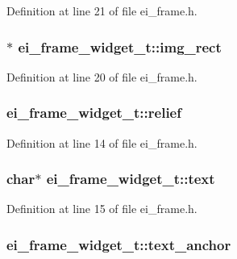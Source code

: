 Definition at line 21 of file ei\_\-frame.h.\hypertarget{structei__frame__widget__t_a0e3772cc22eb4339b9a1c12b0cbd6667}{
\subsubsection[{img\_\-rect}]{$\ast$ {\bf ei\_\-frame\_\-widget\_\-t::img\_\-rect}}}
\label{structei__frame__widget__t_a0e3772cc22eb4339b9a1c12b0cbd6667}


Definition at line 20 of file ei\_\-frame.h.\hypertarget{structei__frame__widget__t_a23ba21889e590728603484c0e4728c8e}{
\subsubsection[{relief}]{ {\bf ei\_\-frame\_\-widget\_\-t::relief}}}
\label{structei__frame__widget__t_a23ba21889e590728603484c0e4728c8e}


Definition at line 14 of file ei\_\-frame.h.\hypertarget{structei__frame__widget__t_affbafa0c71029ba42c4173d665593ccd}{
\subsubsection[{text}]{\setlength{\rightskip}{0pt plus 5cm}char$\ast$ {\bf ei\_\-frame\_\-widget\_\-t::text}}}
\label{structei__frame__widget__t_affbafa0c71029ba42c4173d665593ccd}


Definition at line 15 of file ei\_\-frame.h.\hypertarget{structei__frame__widget__t_a47ce58b9e3c67b6567a9b7739e217111}{
\subsubsection[{text\_\-anchor}]{ {\bf ei\_\-frame\_\-widget\_\-t::text\_\-anchor}}}
\label{structei__frame__widget__t_a47ce58b9e3c67b6567a9b7739e217111}


